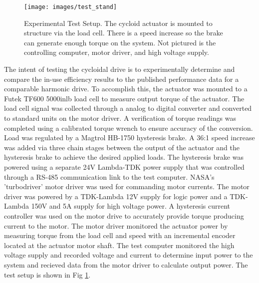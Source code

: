 \begin{figure}[!b]
   \centering
   \texttt{[image: images/test\_stand]}
   \caption{Experimental Test Setup.
   The cycloid actuator is mounted to structure via the load cell.
   There is a speed increase so the brake can generate enough torque on the system.
   Not pictured is the controlling computer, motor driver, and high voltage supply.}
   \label{test_setup}
\end{figure}

The intent of testing the cycloidal drive is to experimentally determine and compare the in-use efficiency results to the published performance data for a comparable harmonic drive.
To accomplish this, the actuator was mounted to a Futek TF600 5000inlb load cell to measure output torque of the actuator.
The load cell signal was collected through a analog to digital converter and converted to standard units on the motor driver.
A verification of torque readings was completed using a calibrated torque wrench to ensure accuracy of the conversion.
Load was regulated by a Magtrol HB-1750 hysteresis brake.
A 36:1 speed increase was added via three chain stages between the output of the actuator and the hysteresis brake to achieve the desired applied loads.
The hysteresis brake was powered using a separate 24V Lambda-TDK power supply that was controlled through a RS-485 communication link to the test computer.
NASA's 'turbodriver' motor driver was used for commanding motor currents.
The motor driver was powered by a TDK-Lambda 12V supply for logic power and a TDK-Lambda 150V and 5A supply for high voltage power.
A hysteresis current controller was used on the motor drive to accurately provide torque producing current to the motor.
The motor driver monitored the actuator power by measuring torque from the load cell and speed with an incremental encoder located at the actuator motor shaft.
The test computer monitored the high voltage supply and recorded voltage and current to determine input power to the system and recieved data from the motor driver to calculate output power.
The test setup is shown in Fig \ref{test_setup}.

